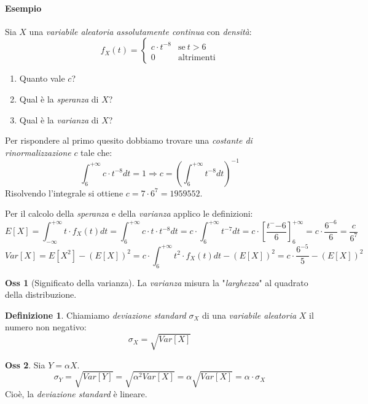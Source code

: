 \documentclass[12pt, a4paper]{report}
\theoremstyle{definition}
\newtheorem{definition}{Definizione}[section]
\newtheorem*{observation}{Oss}
\begin{document}
\paragraph*{Esempio}
Sia $X$ una \emph{variabile aleatoria assolutamente continua} con \emph{densità}:
\[f_X(t)=\begin{cases}
	{c\cdot t^{-8}} & \text{se}\ {t>6}\\
	{0} & \text{altrimenti}
\end{cases}\]
\begin{enumerate}[label=(\roman*)]
	\item Quanto vale $c$?
	\item Qual è la \emph{speranza} di $X$?
	\item Qual è la \emph{varianza} di $X$?
\end{enumerate}
Per rispondere al primo quesito dobbiamo trovare una \emph{costante di rinormalizzazione}
$c$ tale che:
\[\int_6^{+\infty}c\cdot t^{-8}dt=1\Rightarrow c=\left(\int_6^{+\infty}t^{-8}dt\right)
^{-1}\]
Risolvendo l'integrale si ottiene \(c=7\cdot 6^7=1959552\).

Per il calcolo della \emph{speranza} e della \emph{varianza} applico le definizioni:
\[E[X]=\int_{-\infty}^{+\infty}t\cdot f_X(t)dt=\int_6^{+\infty}c\cdot t\cdot t^{-8}dt=c\cdot \int_6^
{+\infty}t^{-7}dt=c\cdot \left[\frac{t^-{-6}}{6}\right]_6^{+\infty}=c\cdot \frac{6^{-6}}{6}
=\frac{c}{6^{7}}\]
\[Var[X]=E[X^2]-(E[X])^2=c\cdot \int_6^{+\infty}t^2\cdot f_X(t)dt-(E[X])^2=c\cdot \frac{6^{-5}}
{5}-(E[X])^2\]

\begin{observation}[Significato della varianza]
	La \emph{varianza} misura la "\emph{larghezza}" al quadrato della distribuzione.
\end{observation}
\begin{definition}
	Chiamiamo \emph{deviazione standard} $\sigma_X$ di una \emph{variabile aleatoria}
	$X$ il numero non negativo:
	\[\sigma_X=\sqrt{Var[X]}\]
\end{definition}
\begin{observation}
	Sia $Y=\alpha X$.
	\[\sigma_Y=\sqrt{Var[Y]}=\sqrt{\alpha^2Var[X]}=\alpha\sqrt{Var[X]}=\alpha\cdot \sigma_X\]
	Cioè, la \emph{deviazione standard} è lineare.
\end{observation}
\end{document}
